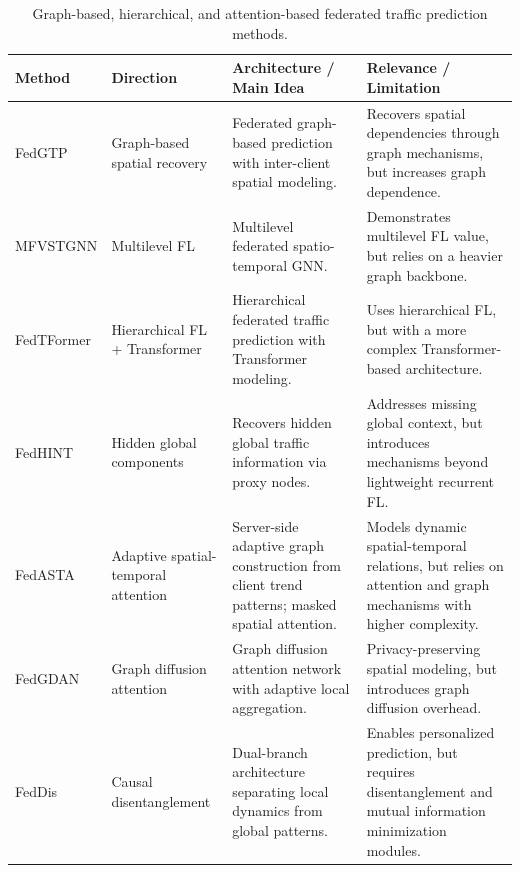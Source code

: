 \begin{table}[H]
\centering
\caption{Graph-based, hierarchical, and attention-based federated traffic prediction methods.}
\label{tab:fed_graph}
\small
\renewcommand{\arraystretch}{1.25}
\setlength{\tabcolsep}{5pt}

\begin{tabularx}{\textwidth}{p{1.8cm} p{2.2cm} Y Y}
\toprule
\textbf{Method} & \textbf{Direction} & \textbf{Architecture / Main Idea} & \textbf{Relevance / Limitation} \\
\midrule

FedGTP \cite{yang2024fedgtp}
& Graph-based spatial recovery
& Federated graph-based prediction with inter-client spatial modeling.
& Recovers spatial dependencies through graph mechanisms, but increases graph dependence. \\

MFVSTGNN \cite{liu2023mfvstgnn}
& Multilevel FL
& Multilevel federated spatio-temporal GNN.
& Demonstrates multilevel FL value, but relies on a heavier graph backbone. \\

FedTFormer \cite{shuai2025fedtformer}
& Hierarchical FL + Transformer
& Hierarchical federated traffic prediction with Transformer modeling.
& Uses hierarchical FL, but with a more complex Transformer-based architecture. \\

FedHINT \cite{zhou2026fedhint}
& Hidden global components
& Recovers hidden global traffic information via proxy nodes.
& Addresses missing global context, but introduces mechanisms beyond lightweight recurrent FL. \\

FedASTA \cite{chen2024fedasta}
& Adaptive spatial-temporal attention
& Server-side adaptive graph construction from client trend patterns; masked spatial attention.
& Models dynamic spatial-temporal relations, but relies on attention and graph mechanisms with higher complexity. \\

FedGDAN \cite{li2025fedgdan}
& Graph diffusion attention
& Graph diffusion attention network with adaptive local aggregation.
& Privacy-preserving spatial modeling, but introduces graph diffusion overhead. \\

FedDis \cite{zhou2026feddis}
& Causal disentanglement
& Dual-branch architecture separating local dynamics from global patterns.
& Enables personalized prediction, but requires disentanglement and mutual information minimization modules. \\

\bottomrule
\end{tabularx}
\end{table}


